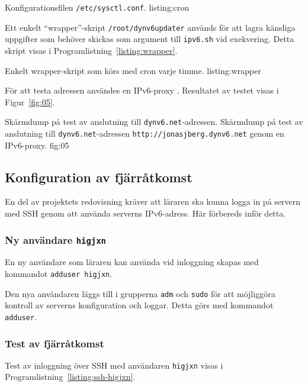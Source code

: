              {Konfigurationsfilen \texttt{/etc/sysctl.conf}.}
             {listing:cron}


Ett enkelt ``wrapper''-skript \texttt{/root/dynv6updater} används för att lagra
känsliga uppgifter som behöver skickas som argument till \texttt{ipv6.sh} vid
exekvering.  Detta skript visas i Programlistning~\ref{listing:wrapper}.

            {Enkelt wrapper-skript som körs med cron varje timme.}
            {listing:wrapper}


För att testa adressen användes en IPv6-proxy \cite{ipv6:ipv6proxy}.
Resultatet av testet visas i Figur~\ref{fig:05}.

           {Skärmdump på test av anslutning till \texttt{dynv6.net}-adressen.}
           {Skärmdump på test av anslutning till \texttt{dynv6.net}-adressen 
					  \texttt{http://jonasjberg.dynv6.net} genom en IPv6-proxy.}
           {fig:05}


\subsection{Konfiguration av fjärråtkomst}
En del av projektets redovisning kräver att läraren ska kunna logga in på servern
med SSH genom att använda serverns IPv6-adress. Här förbereds inför detta.


\subsubsection{Ny användare \texttt{higjxn}}
En ny användare som läraren kan använda vid inloggning skapas med kommandot
\texttt{adduser higjxn}.

Den nya användaren läggs till i grupperna \texttt{adm} och \texttt{sudo} för
att möjliggöra kontroll av serverns konfiguration och loggar. Detta görs med
kommandot \texttt{adduser}.


\subsubsection{Test av fjärråtkomst}
Test av inloggning över SSH med användaren \texttt{higjxn} visas i
Programlistning~\ref{listing:ssh-higjxn}.

